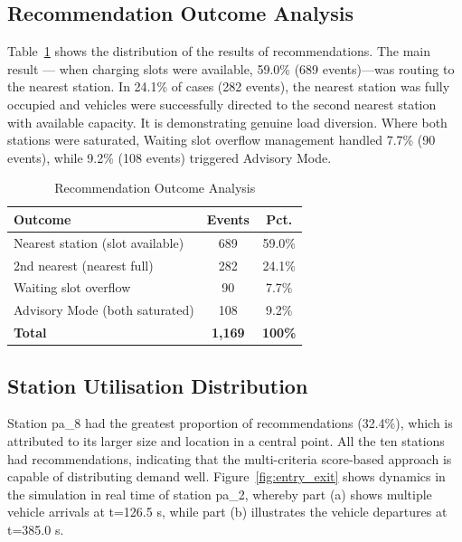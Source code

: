 \documentclass[conference]{IEEEtran}
\begin{document}
\subsection{Recommendation Outcome Analysis}

Table~\ref{tab:outcomes} shows the distribution of the results of
recommendations. The main result --- when charging slots were available,
59.0\% (689 events)---was routing to the nearest station. In 24.1\% of
cases (282 events), the nearest station was fully occupied and vehicles
were successfully directed to the second nearest station with available
capacity. It is demonstrating genuine load diversion. Where both
stations were saturated, Waiting slot overflow management handled 7.7\%
(90 events), while 9.2\% (108 events) triggered Advisory Mode.

\begin{table}[htbp]
\caption{Recommendation Outcome Analysis}
\label{tab:outcomes}
\begin{center}
\small
\begin{tabular}{|l|c|c|}
\hline
\textbf{Outcome} & \textbf{Events} & \textbf{Pct.} \\
\hline
Nearest station (slot available)  & 689 & 59.0\% \\
\hline
2nd nearest (nearest full)        & 282 & 24.1\% \\
\hline
Waiting slot overflow             & 90  &  7.7\% \\
\hline
Advisory Mode (both saturated)    & 108 &  9.2\% \\
\hline
\textbf{Total}                    & \textbf{1,169} & \textbf{100\%} \\
\hline
\end{tabular}
\end{center}
\end{table}

\subsection{Station Utilisation Distribution}

Station pa\_8 had the greatest proportion of recommendations (32.4\%), which is attributed to its larger size and location in a central point. All the ten stations had recommendations, indicating that the multi-criteria score-based approach \cite{b7, b12} is capable of distributing demand well. Figure~\ref{fig:entry_exit} shows dynamics in the simulation in real time of station pa\_2, whereby part (a) shows multiple vehicle arrivals at t=126.5 s, while part (b) illustrates the vehicle departures at t=385.0 s.
\end{document}
